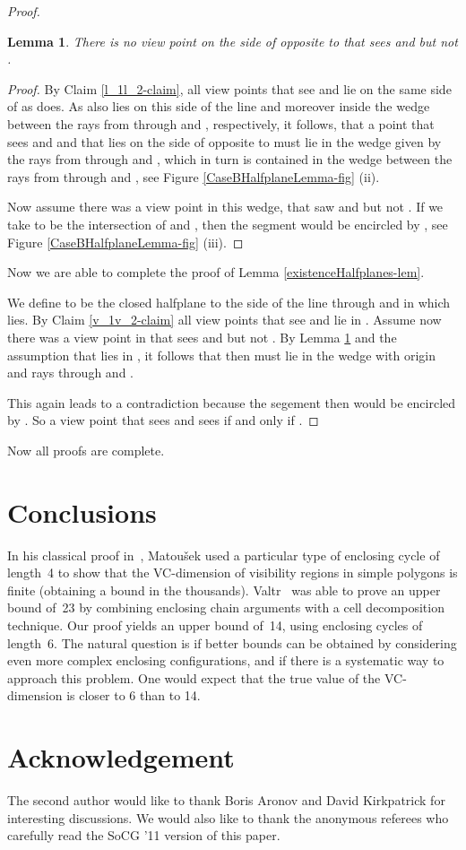 \documentclass[11pt]{article}
\newtheorem{lemma}{Lemma}
\begin{document}
\begin{proof}
\begin{lemma}\label{Case1aHalfplaneSummary}There is no view point on the side of  opposite to  that sees  and  but not .
\end{lemma}

\begin{proof}
By Claim \ref{l_1l_2-claim}, all view points that see  and  lie on the same side of  as  does.  
As  also lies on this side of the line and moreover inside the wedge between the rays from  through  and , respectively, it follows, that a point that sees  and  and that lies on the side of  opposite to  must lie in the wedge given by the rays from  through  and , which in turn is contained in the wedge between the rays from  through  and , see Figure \ref{CaseBHalfplaneLemma-fig} (ii). 

Now assume there was a view point  in this wedge, that saw  and  but not . If we take  to be the intersection of  and , then the segment  would be encircled by , 
see Figure \ref{CaseBHalfplaneLemma-fig} (iii).

\end{proof}

Now we are able to complete the proof of Lemma \ref{existenceHalfplanes-lem}.

We define  to be the closed halfplane to the side of the line through  and  in which  lies. By Claim \ref{v_1v_2-claim} all view points that see  and  lie in . Assume now there was a view point  in  
that sees  and  but not . 
By Lemma \ref{Case1aHalfplaneSummary} and the assumption that  lies in , it follows that then  must lie in the wedge with origin  and rays through  and . 

This again leads to a contradiction because the segement  then would be encircled by .
So a view point  that sees  and  sees  if and only if .
\end{proof}
Now all proofs are complete.



\section{Conclusions}      \label{conclu-sec}                                           

In his classical proof in~\cite{m-ldg-02}, Matou\v sek used
a particular type of enclosing cycle of length~4 to show that the VC-dimension of visibility
regions in simple polygons is finite (obtaining a bound in the thousands). Valtr~\cite{v-ggwps-98}
was able to prove an upper bound of~23 by combining enclosing chain arguments with a
cell decomposition technique. Our proof yields an upper bound of~14, using enclosing
cycles of length~6. The natural question is if better bounds can be obtained by considering
even more complex enclosing configurations, and if there is a systematic way to approach
this problem. One would expect that the true value of the VC-dimension is
closer to 6 than to 14.




\section{Acknowledgement}
The second author would like to thank Boris Aronov and David Kirkpatrick for interesting discussions. We would also like to thank the anonymous referees who carefully read the SoCG '11 version of this paper.

\bigskip

{}

\end{document}
